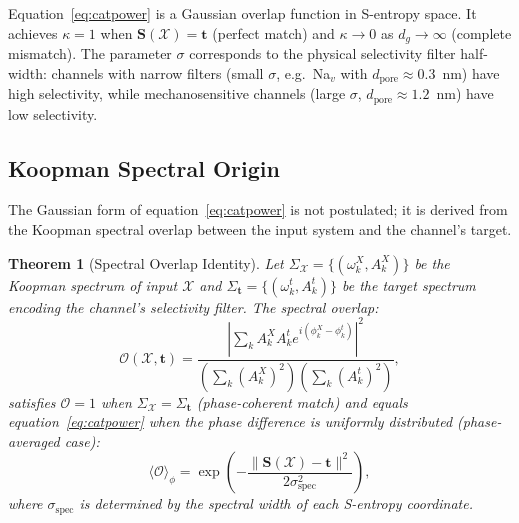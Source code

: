 \documentclass[11pt,twocolumn,a4paper]{article}
\newtheorem{theorem}{Theorem}[section]
\theoremstyle{definition}
\theoremstyle{remark}
\newcommand{\kap}{\kappa}
\newcommand{\Sent}{\bm{S}}
\begin{document}
Equation~\eqref{eq:catpower} is a Gaussian overlap function in S-entropy space.
It achieves $\kap = 1$ when $\Sent(\mathcal{X}) = \mathbf{t}$ (perfect match)
and $\kap \to 0$ as $d_g \to \infty$ (complete mismatch). The parameter
$\sigma$ corresponds to the physical selectivity filter half-width: channels with
narrow filters (small $\sigma$, e.g.\ Na$_v$ with $d_{\mathrm{pore}} \approx 0.3$~nm)
have high selectivity, while mechanosensitive channels (large $\sigma$,
$d_{\mathrm{pore}} \approx 1.2$~nm) have low selectivity.

\subsection{Koopman Spectral Origin}

The Gaussian form of equation~\eqref{eq:catpower} is not postulated; it is
derived from the Koopman spectral overlap between the input system and the
channel's target.

\begin{theorem}[Spectral Overlap Identity]
\label{thm:overlap}
Let $\Sigma_{\mathcal{X}} = \{(\omega_k^X, A_k^X)\}$ be the Koopman spectrum
of input $\mathcal{X}$ and $\Sigma_{\mathbf{t}} = \{(\omega_k^t, A_k^t)\}$
be the target spectrum encoding the channel's selectivity filter.
The spectral overlap:
\begin{equation}
\mathcal{O}(\mathcal{X}, \mathbf{t}) = \frac{\left|\sum_k A_k^X A_k^t
e^{i(\phi_k^X - \phi_k^t)}\right|^2}{\left(\sum_k (A_k^X)^2\right)
\left(\sum_k (A_k^t)^2\right)},
\label{eq:overlap}
\end{equation}
satisfies $\mathcal{O} = 1$ when $\Sigma_{\mathcal{X}} = \Sigma_{\mathbf{t}}$
(phase-coherent match) and equals equation~\eqref{eq:catpower} when the
phase difference is uniformly distributed (phase-averaged case):
\begin{equation}
\langle \mathcal{O} \rangle_\phi = \exp\!\left(-\frac{\|\Sent(\mathcal{X}) - \mathbf{t}\|^2}{2\sigma_{\mathrm{spec}}^2}\right),
\label{eq:overlap_avg}
\end{equation}
where $\sigma_{\mathrm{spec}}$ is determined by the spectral width of each
S-entropy coordinate.
\end{theorem}
\end{document}
